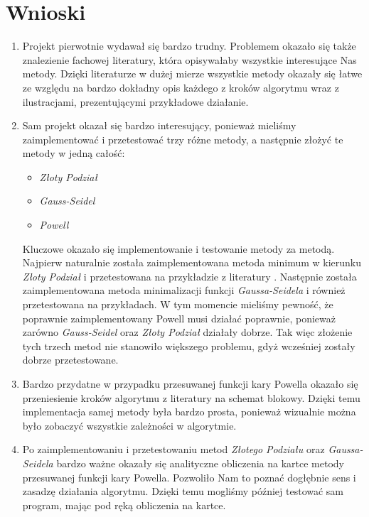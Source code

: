 \documentclass[a4paper,12pt]{article}
\begin{document}
\section{Wnioski}
\begin{enumerate}
    \item Projekt pierwotnie wydawał się bardzo trudny. Problemem okazało się także znalezienie fachowej literatury, która opisywałaby wszystkie interesujące Nas metody. Dzięki literaturze \cite{bibitem1} w dużej mierze wszystkie metody okazały się łatwe ze względu na bardzo dokładny opis każdego z kroków algorytmu wraz z ilustracjami, prezentującymi przykładowe działanie.
    
    \item Sam projekt okazał się bardzo interesujący, ponieważ mieliśmy zaimplementować i przetestować trzy różne metody, a następnie złożyć te metody w jedną całość:
    \begin{itemize}
        \item \textit{Złoty Podział}
        \item \textit{Gauss-Seidel}
        \item \textit{Powell}
    \end{itemize}
    Kluczowe okazało się implementowanie i testowanie metody za metodą. Najpierw naturalnie została zaimplementowana metoda minimum w kierunku \textit{Złoty Podział} i przetestowana na przykładzie z literatury \cite{bibitem2}. Następnie została zaimplementowana metoda minimalizacji funkcji \textit{Gaussa-Seidela} i również przetestowana na przykładach. W tym momencie mieliśmy pewność, że poprawnie zaimplementowany Powell musi działać poprawnie, ponieważ zarówno \textit{Gauss-Seidel} oraz \textit{Złoty Podział} działały dobrze. Tak więc złożenie tych trzech metod nie stanowiło większego problemu, gdyż wcześniej zostały dobrze przetestowane.
    
    \item Bardzo przydatne w przypadku przesuwanej funkcji kary Powella okazało się przeniesienie kroków algorytmu z literatury \cite{bibitem1} na schemat blokowy. Dzięki temu implementacja samej metody była bardzo prosta, ponieważ wizualnie można było zobaczyć wszystkie zależności w algorytmie.
    
    \item Po zaimplementowaniu i przetestowaniu metod \textit{Złotego Podziału} oraz \textit{Gaussa-Seidela} bardzo ważne okazały się analityczne obliczenia na kartce metody przesuwanej funkcji kary Powella. Pozwoliło Nam to poznać dogłębnie sens i zasadzę działania algorytmu. Dzięki temu mogliśmy później testować sam program, mając pod ręką obliczenia na kartce.
    

\end{enumerate}
\end{document}
